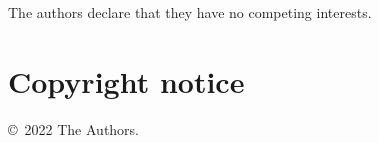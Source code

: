 \documentclass[a4paper]{article}
\begin{document}
	The authors declare that they have no competing interests.
	
	
	
	
	
	
	
	\section*{Copyright notice}\label{h.jm5gcqv4g8x0}
	
	\copyright~2022 The Authors. %
	
	
	
\end{document}
